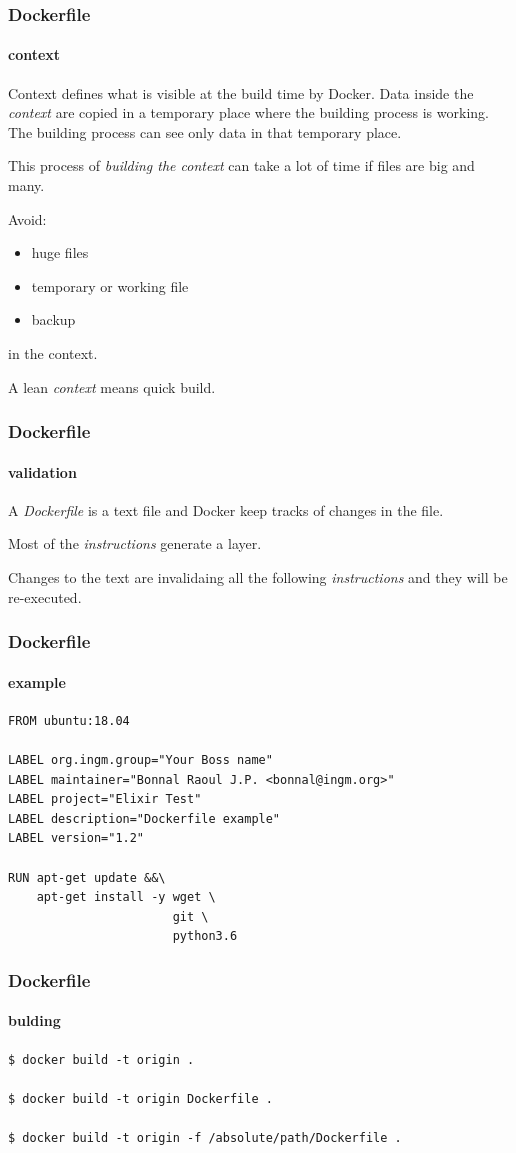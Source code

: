 \begin{frame}[fragile]
\frametitle{Dockerfile}
\framesubtitle{context}

Context defines what is visible at the build time by Docker.
Data inside the \textit{context} are copied in a temporary place where the building process is working. The building process can see only data in that temporary place. 

This process of \textit{building the context} can take a lot of time if files are big and many.

Avoid:
\begin{itemize}
\item huge files
\item temporary or working file
\item backup 
\end{itemize}

in the context.

A lean \textit{context} means quick build.
\end{frame}

\begin{frame}
\frametitle{Dockerfile}
\framesubtitle{validation}

A \textit{Dockerfile} is a text file and Docker keep tracks of changes in the file.

Most of the \textit{instructions} generate a layer. 

Changes to the text are invalidaing all the following \textit{instructions} and they will be re-executed.
\end{frame}

\begin{frame}[fragile]
\frametitle{Dockerfile}
\framesubtitle{example}

\begin{lstlisting}
FROM ubuntu:18.04

LABEL org.ingm.group="Your Boss name"
LABEL maintainer="Bonnal Raoul J.P. <bonnal@ingm.org>"
LABEL project="Elixir Test"
LABEL description="Dockerfile example"
LABEL version="1.2"

RUN apt-get update &&\
    apt-get install -y wget \
	                   git \
	                   python3.6
\end{lstlisting}
\end{frame}

\begin{frame}[fragile]
\frametitle{Dockerfile}
\framesubtitle{bulding}

\begin{lstlisting}
$ docker build -t origin .

$ docker build -t origin Dockerfile .

$ docker build -t origin -f /absolute/path/Dockerfile .
\end{lstlisting}
\end{frame}

